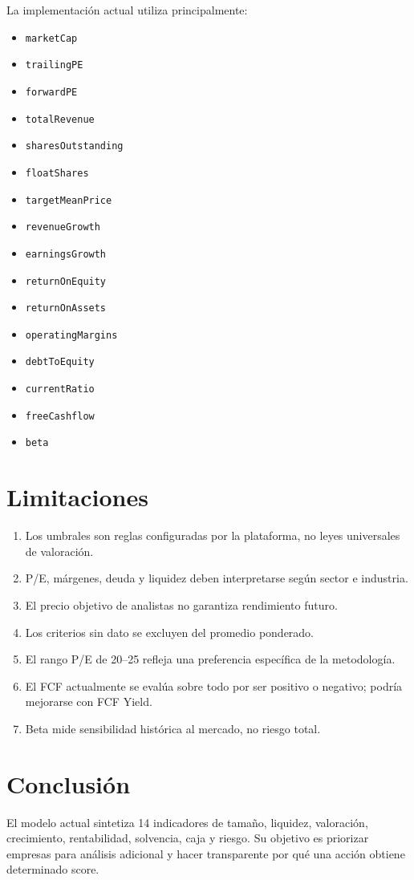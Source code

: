 \documentclass[11pt,a4paper]{article}
\begin{document}
La implementación actual utiliza principalmente:
\begin{itemize}[leftmargin=*]
\item \texttt{marketCap}
\item \texttt{trailingPE}
\item \texttt{forwardPE}
\item \texttt{totalRevenue}
\item \texttt{sharesOutstanding}
\item \texttt{floatShares}
\item \texttt{targetMeanPrice}
\item \texttt{revenueGrowth}
\item \texttt{earningsGrowth}
\item \texttt{returnOnEquity}
\item \texttt{returnOnAssets}
\item \texttt{operatingMargins}
\item \texttt{debtToEquity}
\item \texttt{currentRatio}
\item \texttt{freeCashflow}
\item \texttt{beta}
\end{itemize}

\section{Limitaciones}

\begin{enumerate}[leftmargin=*]
\item Los umbrales son reglas configuradas por la plataforma, no leyes universales de valoración.
\item P/E, márgenes, deuda y liquidez deben interpretarse según sector e industria.
\item El precio objetivo de analistas no garantiza rendimiento futuro.
\item Los criterios sin dato se excluyen del promedio ponderado.
\item El rango P/E de 20--25 refleja una preferencia específica de la metodología.
\item El FCF actualmente se evalúa sobre todo por ser positivo o negativo; podría mejorarse con FCF Yield.
\item Beta mide sensibilidad histórica al mercado, no riesgo total.
\end{enumerate}

\section{Conclusión}

El modelo actual sintetiza 14 indicadores de tamaño, liquidez, valoración, crecimiento, rentabilidad, solvencia, caja y riesgo. Su objetivo es priorizar empresas para análisis adicional y hacer transparente por qué una acción obtiene determinado score.
\end{document}
